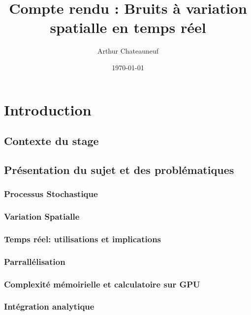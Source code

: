 \documentclass[9pt, twocolumn]{article} %
\title{Compte rendu : Bruits à variation spatialle en temps réel} %
\author{Arthur Chateauneuf} %
\date{\today} %
\begin{document}
\fontsize{9pt}{10pt}\selectfont

\onecolumn
\maketitle %
\tableofcontents
\twocolumn

\clearpage

\section{Introduction}

\subsection{Contexte du stage}

\subsection{Présentation du sujet et des problématiques}

\subsubsection{Processus Stochastique}

\subsubsection{Variation Spatialle}

\subsubsection{Temps réel: utilisations et implications}

\subsubsection{Parrallélisation}
\subsubsection{Complexité mémoirielle et calculatoire sur GPU}
\subsubsection{Intégration analytique}
\end{document}
